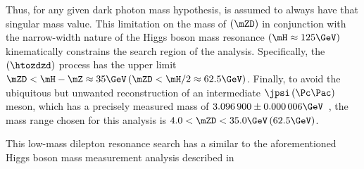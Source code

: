 Thus, for any given dark photon mass hypothesis, \PZD is assumed to always have that singular mass value.
This limitation on the mass of \PZD $\left(\mZD\right)$ in conjunction with the narrow-width nature of the Higgs boson mass resonance $\left( \mH \approx 125\GeV \right)$ kinematically constrains the search region of the analysis.
Specifically, the \htozzd $\left(\htozdzd\right)$ process has the upper limit
$\mZD < \mH - \mZ \approx 35\GeV    \left(\mZD < \mH / 2 \approx 62.5\GeV\right)$.
Finally, to avoid the ubiquitous but unwanted reconstruction of an intermediate $\jpsi \left(\Pc\Pac\right)$ meson,
which has a precisely measured mass of $3.096\,900 \pm 0.000\,006\GeV$~\cite{particle_data_group_review_2020},
the mass range chosen for this analysis is $4.0 < \mZD < 35.0\GeV \left(62.5\GeV\right)$.

This low-mass dilepton resonance search has a similar  to the aforementioned Higgs boson mass measurement analysis described in 